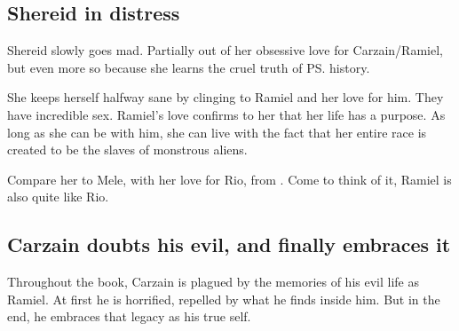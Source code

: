\begin{garbage}
\subsection{Shereid in distress}
Shereid slowly goes mad. Partially out of her obsessive love for Carzain/Ramiel, but even more so because she learns the cruel truth of \ps{\humanity} history. 

She keeps herself halfway sane by clinging to Ramiel and her love for him. 
They have incredible sex. Ramiel's love confirms to her that her life has a purpose. As long as she can be with him, she can live with the fact that her entire race is created to be the slaves of monstrous aliens. 

Compare her to Mele, with her love for Rio, from \emph{\JuukenSentaiGekiranger}. Come to think of it, Ramiel is also quite like Rio. 









\subsection{Carzain doubts his evil, and finally embraces it}
Throughout the book, Carzain is plagued by the memories of his evil life as Ramiel. At first he is horrified, repelled by what he finds inside him. But in the end, he embraces that legacy as his true self.

\end{garbage}
